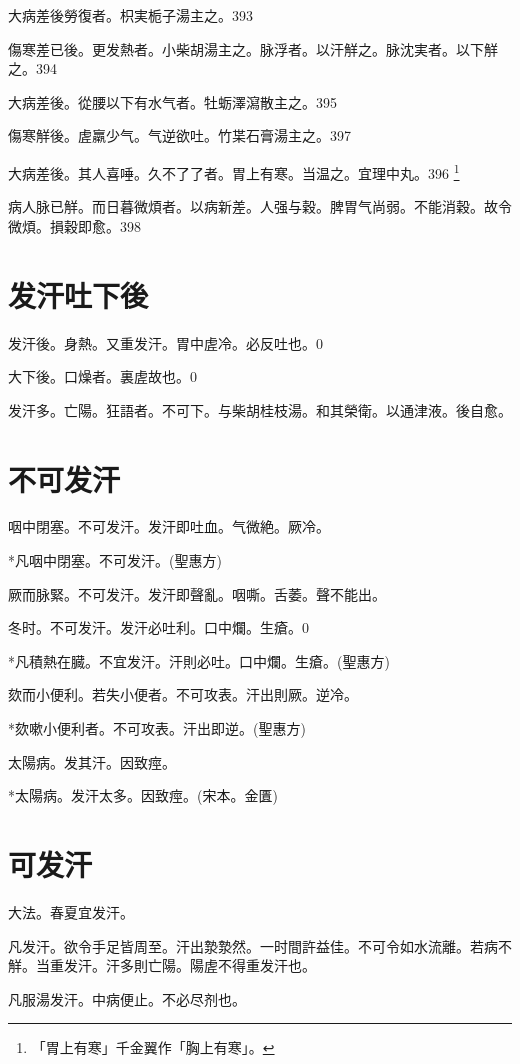 \documentclass[12pt,twoside,UTF8,b5paper]{ctexbook}
\begin{document}
大病差後勞復者。枳実栀子湯主之。393

傷寒差已後。更发熱者。小柴胡湯主之。脉浮者。以汗觧之。脉沈実者。以下觧之。394

大病差後。從腰以下有水气者。牡蛎澤瀉散主之。395

傷寒觧後。虗羸少气。气逆欲吐。竹枼石膏湯主之。397

大病差後。其人喜唾。久不了了者。胃上有寒。当温之。宜理中丸。396
	\footnote{「胃上有寒」千金翼作「胸上有寒」。}

病人脉已觧。而日暮微煩者。以病新差。人强与穀。脾胃气尚弱。不能消穀。故令微煩。損穀即愈。398

\chapter{发汗吐下後}

发汗後。身熱。又重发汗。胃中虗冷。必反吐也。0

大下後。口燥者。裏虗故也。0

发汗多。亡陽。狂語者。不可下。与柴胡桂枝湯。和其榮衛。以通津液。後自愈。

\chapter{不可发汗}

咽中閉塞。不可发汗。发汗即吐血。气微絶。厥冷。

*凡咽中閉塞。不可发汗。(聖惠方)

厥{而脉緊}。不可发汗。发汗即聲亂。咽嘶。舌萎。聲不能出。

冬时。不可发汗。发汗必吐利。口中爛。生瘡。0

*凡積熱在臓。不宜发汗。汗則必吐。口中爛。生瘡。(聖惠方)

欬而小便利。若失小便者。不可攻表。汗出則厥。逆冷。

*欬嗽小便利者。不可攻表。汗出即逆。(聖惠方)

太陽病。发其汗。因致痙。

*太陽病。发汗太多。因致痙。(宋本。金匱)

\chapter{可发汗}

大法。春夏宜发汗。

凡发汗。欲令手足皆周至。汗出漐漐然。一时間許益佳。不可令如水流離。若病不觧。当重发汗。汗多則亡陽。陽虗不得重发汗也。

凡服湯发汗。中病便止。不必尽剂也。
\end{document}
